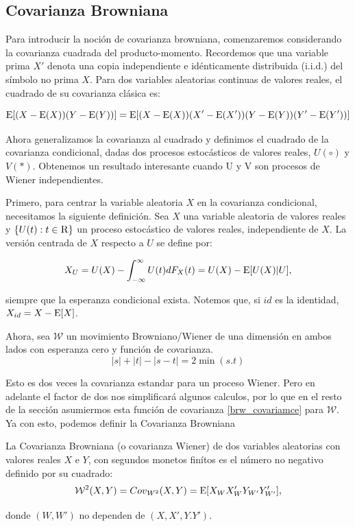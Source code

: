 	\subsection{Covarianza Browniana}
		
		Para introducir la noci\'on de covarianza browniana, comenzaremos considerando la covarianza cuadrada del producto-momento. Recordemos que una variable prima $X'$ denota una copia independiente e id\'enticamente distribuida (i.i.d.) del símbolo no prima $X$. Para dos variables aleatorias continuas de valores reales, el cuadrado de su covarianza clásica es:

		$$\operatorname{E}[(X-\operatorname{E}(X))(Y-\operatorname{E}(Y))] = \operatorname{E}[(X-\operatorname{E}(X))(X'-\operatorname{E}(X'))(Y-\operatorname{E}(Y))(Y'-\operatorname{E}(Y'))]	$$

		Ahora generalizamos la covarianza al cuadrado y definimos el cuadrado de la covarianza condicional, dadas dos procesos estocásticos de valores reales, $U(\circ)$ y $V(*)$. Obtenemos un resultado interesante cuando U y V son procesos de Wiener independientes.


		Primero, para centrar la variable aleatoria $X$ en la covarianza condicional, necesitamos la siguiente definici\'on. Sea $X$ una variable aleatoria de valores reales y $\{U(t): t \in \textsc{R}\}$ un proceso estoc\'astico de valores reales, independiente de $X$. La versi\'on centrada de $X$ respecto a $U$ se define por:

		$$
		X_U = U(X)-\int_{-\infty}^{\infty}U(t)dF_X(t)=U(X)-\operatorname{E}[U(X)|U],
		$$

		siempre que la esperanza condicional exista. Notemos que, si $id$ es la identidad, $X_{id}=X-\operatorname{E}[X]$. 

		Ahora, sea $\mathcal{W}$ un movimiento Browniano/Wiener de una dimensi\'on en ambos lados con esperanza cero y funci\'on de covarianza.
		\begin{equation}\label{brw_covariamce}
			|s|+|t|-|s-t|=2\min(s.t)
		\end{equation}
			

		Esto es dos veces la covarianza estandar para un proceso Wiener. Pero en adelante el factor de dos nos simplificar\'a algunos calculos, por lo que en el resto de la secci\'on asumiermos esta funci\'on de covarianza \ref{brw_covariamce} para $\mathcal{W}$. Ya con esto, podemos definir la Covarianza Browniana 

		\begin{defn}
			La Covarianza Browniana (o covarianza Wiener) de dos variables aleatorias con valores reales $X$ e $Y$, con segundos monetos fin\'itos es el n\'umero no negativo definido por su cuadrado:
			\begin{equation}\label{brw_cov}
				\mathcal{W}^2(X,Y)={Cov}_{{W}^2}(X,Y)=\operatorname{E}[X_{W}X'_{W}Y_{W'}Y'_{W'}],
			\end{equation}

			donde $({W},{W'})$ no dependen de $(X,X',Y.Y')$.
		\end{defn}

